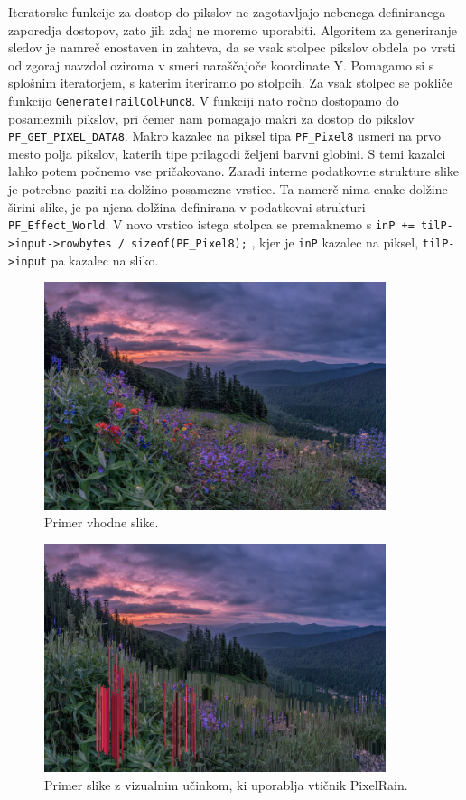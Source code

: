 \documentclass[a4paper, 12pt]{book}
\begin{document}
Iteratorske funkcije za dostop do pikslov ne zagotavljajo nebenega definiranega zaporedja dostopov, zato jih zdaj ne moremo uporabiti.
Algoritem za generiranje sledov je namreč enostaven in zahteva, da se vsak stolpec pikslov obdela po vrsti od zgoraj navzdol oziroma v smeri naraščajoče koordinate Y.
Pomagamo si s splošnim iteratorjem, s katerim iteriramo po stolpcih.
Za vsak stolpec se pokliče funkcijo \verb!GenerateTrailColFunc8!.
V funkciji nato ročno dostopamo do posameznih pikslov, pri čemer nam pomagajo makri za dostop do pikslov \verb!PF_GET_PIXEL_DATA8!.
Makro kazalec na piksel tipa \verb!PF_Pixel8! usmeri na prvo mesto polja pikslov, katerih tipe prilagodi željeni barvni globini.
S temi kazalci lahko potem počnemo vse pričakovano. 
Zaradi interne podatkovne strukture slike je potrebno paziti na dolžino posamezne vrstice.
Ta namerč nima enake dolžine širini slike, je pa njena dolžina definirana v podatkovni strukturi \verb!PF_Effect_World!.
V novo vrstico istega stolpca se premaknemo s
\verb!inP += tilP->input->rowbytes / sizeof(PF_Pixel8);!
, kjer je \texttt{inP} kazalec na piksel, \verb!tilP->input! pa kazalec na sliko.

\begin{figure}[h]
\begin{center}
\includegraphics[width=10cm]{img/colorfulhills.PNG}
\end{center}
\caption{Primer vhodne slike.}
\label{orig1}
\end{figure}

\begin{figure}[h!]
\begin{center}
\includegraphics[width=10cm]{img/colorfulhillsPIXELRAIN.PNG}
\end{center}
\caption{Primer slike z vizualnim učinkom, ki uporablja vtičnik PixelRain.}
\label{demo1}
\end{figure}
\end{document}
